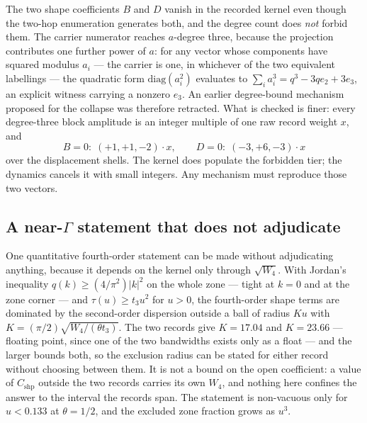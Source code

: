 \documentclass[11pt]{article}
\theoremstyle{plain}
\theoremstyle{definition}
\theoremstyle{remark}
\newcommand{\chk}[1]{}
\begin{document}
The two shape coefficients $B$ and $D$ vanish in the recorded kernel even
though the two-hop enumeration generates both, and the degree count does
\emph{not} forbid them. The carrier numerator reaches $a$-degree three, because
the projection contributes one further power of $a$: for any vector whose
components have squared modulus $a_i$ --- the carrier is one, in whichever of
the two equivalent labellings --- the quadratic form $\mathrm{diag}(a_i^2)$
evaluates to $\sum_i a_i^3=q^3-3qe_2+3e_3$, an explicit witness carrying a
nonzero $e_3$. An earlier degree-bound mechanism proposed
for the collapse was therefore retracted. What is checked is finer: every
degree-three block amplitude is an integer multiple of one raw record weight
$x$, and
\[
  B=0:\;(+1,+1,-2)\cdot x,\qquad
  D=0:\;(-3,+6,-3)\cdot x
\]
over the displacement shells. The kernel does populate the forbidden tier; the
dynamics cancels it with small integers. Any mechanism must reproduce those two
vectors.
\chk{RETRACTED: the vertex count does NOT forbid B\_shp and D\_shp}
\chk{FINDING: the tier collapse is two integer cancellations at record level}
\chk{the vanishing coefficients are exactly the degree-3 ones}

\subsection{A \texorpdfstring{near-$\Gamma$}{near-Gamma} statement that does not adjudicate}

One quantitative fourth-order statement can be made without adjudicating
anything, because it depends on the kernel only through $\sqrt{W_4}$. With
Jordan's inequality $q(k)\ge(4/\pi^2)|k|^2$ on the whole zone --- tight at
$k=0$ and at the zone corner --- and $\tau(u)\ge t_3u^2$ for $u>0$, the
fourth-order shape terms are dominated by the second-order dispersion outside a
ball of radius $Ku$ with
$K=(\pi/2)\sqrt{W_4/(\theta t_3)}$. The two records give $K=17.04$ and
$K=23.66$ --- floating point, since one of the two bandwidths exists only as a
float --- and the larger bounds both, so the exclusion radius can be stated for
either record without choosing between them. It is not a bound on the open
coefficient: a value of $C_{\mathrm{shp}}$ outside the two records carries its
own $W_4$, and nothing here confines the answer to the interval the records
span. The statement is non-vacuous only for $u<0.133$ at $\theta=1/2$,
and the excluded zone fraction grows as $u^3$.
\chk{Jordan bound q(k) >= (4/pi\^{}2)|k|\^{}2 holds on the whole zone}
\chk{the criterion survives C2: K depends on the kernel only through sqrt(W\_4)}
\chk{the statement is non-vacuous only below an explicit coupling}
\end{document}
